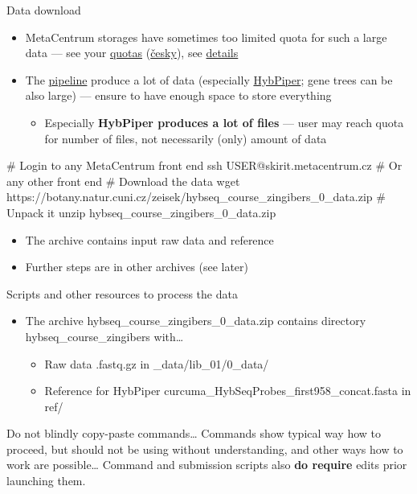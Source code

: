 \documentclass[compress,  xelatex, 11pt, xcolor=x11names, aspectratio=169,
	hyperref={
		bookmarks=true,
		unicode=true,
		colorlinks=true,
		pdftitle={HybSeq course},
		plainpages=false,
		pdfauthor={Vojtech Zeisek},
		pdfsubject={Practical processing of HybSeq target enrichment sequencing data on computing grids like MetaCentrum},
		pdfcreator={XeLaTeX},
		pdfkeywords={BASH, command line, GNU, HybSeq, Linux, MetaCentrum, sequencing shell, target enrichment},
		linkcolor=Turquoise4, %
		anchorcolor=DodgerBlue4, %
		citecolor=DodgerBlue4, %
		filecolor=DodgerBlue4, %
		menucolor=Tan4, %
		urlcolor=DarkOliveGreen4 %
		},
	url={hyphens, lowtilde} %
	]{beamer}
\renewcommand{\texttt}[1]{\colorbox{Cornsilk2}{{\ttfamily #1}}}
\renewcommand{\alert}[1]{\textcolor{OrangeRed3}{#1}}
\begin{document}
\begin{frame}[fragile]{Data download}
	\label{datadownload}
	\begin{itemize}
		\item MetaCentrum storages have sometimes too limited quota for such a large data --- see your \href{https://metavo.metacentrum.cz/en/myaccount/kvoty}{quotas} (\href{http://metavo.metacentrum.cz/cs/myaccount/kvoty}{česky}), see \href{https://docs.metacentrum.cz/data/quotas/}{details}
		\item The \href{https://github.com/V-Z/hybseq-scripts}{pipeline} produce a lot of data (especially \href{https://github.com/mossmatters/HybPiper/}{HybPiper}; gene trees can be also large) --- ensure to have enough space to store everything
		\begin{itemize}
			\item Especially \textbf{HybPiper produces a lot of files} --- \alert{user may reach quota for number of files}, not necessarily (only) amount of data
		\end{itemize}
	\end{itemize}
	\begin{bashcode}
    # Login to any MetaCentrum front end
    ssh USER@skirit.metacentrum.cz # Or any other front end
    # Download the data
    wget https://botany.natur.cuni.cz/zeisek/hybseq_course_zingibers_0_data.zip
    # Unpack it
    unzip hybseq_course_zingibers_0_data.zip
	\end{bashcode}
	\begin{itemize}
		 \item The archive contains input raw data and reference
		 \item Further steps are in other archives (see later)
	\end{itemize}
\end{frame}

\begin{frame}{Scripts and other resources to process the data}
	\begin{itemize}
		\item The archive \texttt{hybseq\_course\_zingibers\_0\_data.zip} contains directory \texttt{hybseq\_course\_zingibers} with\ldots
		\begin{itemize}
			\item Raw data \texttt{*.fastq.gz} in \texttt{1\_data/lib\_01/0\_data/}
			\item Reference for HybPiper \texttt{curcuma\_HybSeqProbes\_first958\_concat.fasta} in \texttt{ref/}
		\end{itemize}
	\end{itemize}
	\begin{alertblock}{Do not blindly copy-paste commands\ldots}
		\alert{Commands show typical way how to proceed, but should not be using without understanding, and other ways how to work are possible\ldots}{ }Command and submission scripts also \textbf{do require} edits prior launching them.
	\end{alertblock}
\end{frame}
\end{document}
